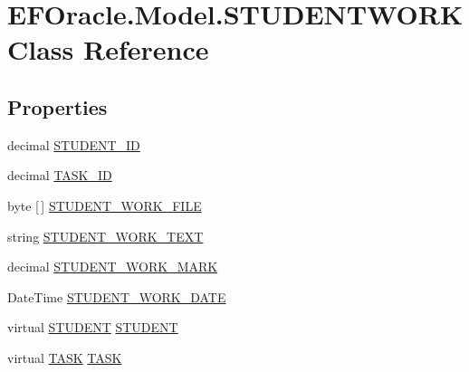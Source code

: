 \hypertarget{class_e_f_oracle_1_1_model_1_1_s_t_u_d_e_n_t_w_o_r_k}{}\section{E\+F\+Oracle.\+Model.\+S\+T\+U\+D\+E\+N\+T\+W\+O\+RK Class Reference}
\label{class_e_f_oracle_1_1_model_1_1_s_t_u_d_e_n_t_w_o_r_k}
\subsection*{Properties}
\begin{DoxyCompactItemize}
\item 
decimal \hyperlink{class_e_f_oracle_1_1_model_1_1_s_t_u_d_e_n_t_w_o_r_k_a3f36d12010505177f346cf525afc2676}{S\+T\+U\+D\+E\+N\+T\+\_\+\+ID}
\item 
decimal \hyperlink{class_e_f_oracle_1_1_model_1_1_s_t_u_d_e_n_t_w_o_r_k_ae5e1b1399a0d87d0e8734b38d49454e4}{T\+A\+S\+K\+\_\+\+ID}
\item 
byte \mbox{[}$\,$\mbox{]} \hyperlink{class_e_f_oracle_1_1_model_1_1_s_t_u_d_e_n_t_w_o_r_k_afcbde24a46bf40621570f152ae53bc61}{S\+T\+U\+D\+E\+N\+T\+\_\+\+W\+O\+R\+K\+\_\+\+F\+I\+LE}
\item 
string \hyperlink{class_e_f_oracle_1_1_model_1_1_s_t_u_d_e_n_t_w_o_r_k_a348581c1ff8940147e8438da4951bd8c}{S\+T\+U\+D\+E\+N\+T\+\_\+\+W\+O\+R\+K\+\_\+\+T\+E\+XT}
\item 
decimal \hyperlink{class_e_f_oracle_1_1_model_1_1_s_t_u_d_e_n_t_w_o_r_k_a175854344d9c008fd6a0e5c3ddfed3b1}{S\+T\+U\+D\+E\+N\+T\+\_\+\+W\+O\+R\+K\+\_\+\+M\+A\+RK}
\item 
Date\+Time \hyperlink{class_e_f_oracle_1_1_model_1_1_s_t_u_d_e_n_t_w_o_r_k_a315baef1a09f3124ca558f9fad18b90e}{S\+T\+U\+D\+E\+N\+T\+\_\+\+W\+O\+R\+K\+\_\+\+D\+A\+TE}
\item 
virtual \hyperlink{class_e_f_oracle_1_1_model_1_1_s_t_u_d_e_n_t}{S\+T\+U\+D\+E\+NT} \hyperlink{class_e_f_oracle_1_1_model_1_1_s_t_u_d_e_n_t_w_o_r_k_ae5b24ab4fe229c6b3799cc5fe9dce11a}{S\+T\+U\+D\+E\+NT}
\item 
virtual \hyperlink{class_e_f_oracle_1_1_model_1_1_t_a_s_k}{T\+A\+SK} \hyperlink{class_e_f_oracle_1_1_model_1_1_s_t_u_d_e_n_t_w_o_r_k_a761e91804ee84a6de7b28dbb420b99f6}{T\+A\+SK}
\end{DoxyCompactItemize}


